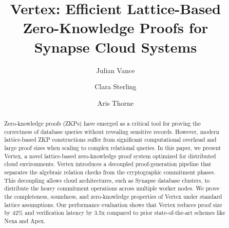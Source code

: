 \documentclass[runningheads]{llncs}
\begin{document}
\title{Vertex: Efficient Lattice-Based Zero-Knowledge Proofs for Synapse Cloud Systems}

\author{Julian Vance \and Clara Sterling \and Aris Thorne}


\maketitle

\begin{abstract}
Zero-knowledge proofs (ZKPs) have emerged as a critical tool for proving the correctness of database queries without revealing sensitive records. However, modern lattice-based ZKP constructions suffer from significant computational overhead and large proof sizes when scaling to complex relational queries. In this paper, we present Vertex, a novel lattice-based zero-knowledge proof system optimized for distributed cloud environments. Vertex introduces a decoupled proof-generation pipeline that separates the algebraic relation checks from the cryptographic commitment phases. This decoupling allows cloud architectures, such as Synapse database clusters, to distribute the heavy commitment operations across multiple worker nodes. We prove the completeness, soundness, and zero-knowledge properties of Vertex under standard lattice assumptions. Our performance evaluation shows that Vertex reduces proof size by 42\% and verification latency by 3.5x compared to prior state-of-the-art schemes like Nexa and Apex.
\end{abstract}










\end{document}
